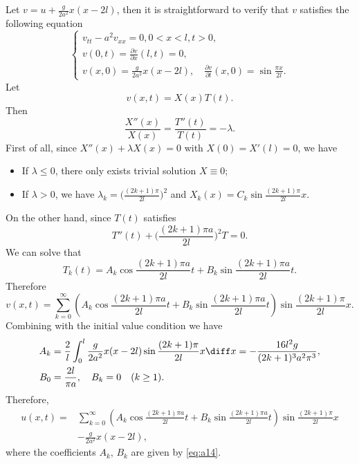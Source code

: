 \begin{solve}
  Let $v=u+\frac{g}{2a^2}x(x-2l)$, then it is straightforward to verify that
  $v$ satisfies the following equation
  \[\begin{cases}
    v_{tt}-a^2v_{xx}=0,0<x<l,t>0, \\
    v(0,t)=\frac{\partial v}{\partial x}(l,t)=0, \\
    v(x,0)=\frac{g}{2a^2}x(x-2l),\quad\frac{\partial v}{\partial t}(x,0)=\sin\frac{\pi x}{2l}.
  \end{cases}\]
  Let
  \[ v(x,t) = X(x)T(t). \]
  Then
  \[ \frac{X''(x)}{X(x)} = \frac{T''(t)}{T(t)} = -\lambda. \]
  First of all, since $X''(x) + \lambda X(x) = 0$ with $X(0) = X'(l) = 0$, we have
  \begin{itemize}
    \item If $\lambda\leq 0$, there only exists trivial solution $X\equiv 0$;
    \item If $\lambda>0$, we have $\lambda_k = \bigl(\frac{(2k+1)\pi}{2l}\bigr)^2$
      and $X_k(x) = C_k \sin\frac{(2k+1)\pi}{2l}x$.
  \end{itemize}
  On the other hand, since $T(t)$ satisfies
  \[ T''(t) + \biggl(\frac{(2k+1)\pi a}{2l}\biggr)^2 T = 0. \]
  We can solve that
  \begin{equation}\label{eq:a12}
    T_k(t) = A_k \cos \frac{(2k+1)\pi a}{2l} t + B_k \sin \frac{(2k+1)\pi a}{2l} t.
  \end{equation}
  Therefore
  \begin{equation}\label{eq:a13}
    v(x,t) = \sum_{k=0}^\infty \left(A_k\cos\frac{(2k+1)\pi a}{2l}t+B_k\sin\frac{(2k+1)\pi a}{2l}t\right)\sin\frac{(2k+1)\pi}{2l}x.
  \end{equation}
  Combining with the initial value condition we have
  \begin{equation}\label{eq:a14}
    \begin{aligned}
      A_k & = \frac{2}{l}\int_0^l\frac{g}{2a^2}x(x-2l)\sin\frac{(2k+1)\pi}{2l}x\diff x
        = -\frac{16l^2g}{(2k+1)^3a^2\pi^3}, \\
      B_0 & = \frac{2l}{\pi a},\quad B_k=0\quad (k\geq 1).
    \end{aligned}
  \end{equation}
  Therefore,
  \begin{align*}
    u(x,t)
    ={} & \sum_{k=0}^{\infty}\left(A_k\cos\frac{(2k+1)\pi a}{2l}t+B_k\sin\frac{(2k+1)\pi a}{2l}t\right)\sin\frac{(2k+1)\pi}{2l}x \\
    & - \frac{g}{2a^2}x(x-2l),
  \end{align*}
  where the coefficients $A_k$, $B_k$ are given by \eqref{eq:a14}.
\end{solve}


